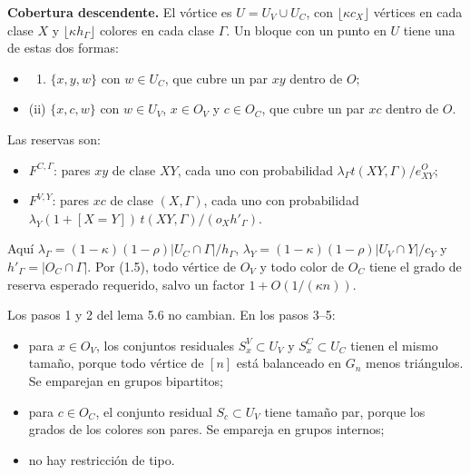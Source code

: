 \documentclass[spanish,11pt,a4paper]{article}
\providecommand{\tightlist}{\setlength{\itemsep}{0pt}\setlength{\parskip}{0pt}}
\begin{document}
\textbf{Cobertura descendente.} El vórtice es \(U=U_V\cup U_C\), con \(\lfloor\kappa c_X\rfloor\) vértices en cada clase \(X\) y \(\lfloor\kappa h_\Gamma\rfloor\) colores en cada clase \(\Gamma\). Un bloque con un punto en \(U\) tiene una de estas dos formas:

\begin{itemize}
\tightlist
\item
  \begin{enumerate}
  \def\labelenumi{(\romannumeral\value{enumi})}
  \tightlist
  \item
    \(\{x,y,w\}\) con \(w\in U_C\), que cubre un par \(xy\) dentro de \(O\);
  \end{enumerate}
\item
  (ii) \(\{x,c,w\}\) con \(w\in U_V\), \(x\in O_V\) y \(c\in O_C\), que cubre un par \(xc\) dentro de \(O\).
\end{itemize}

Las reservas son:

\begin{itemize}
\tightlist
\item
  \(F^{C,\Gamma}\): pares \(xy\) de clase \(XY\), cada uno con probabilidad \(\lambda_\Gamma t(XY,\Gamma)/e^O_{XY}\);
\item
  \(F^{V,Y}\): pares \(xc\) de clase \((X,\Gamma)\), cada uno con probabilidad \(\lambda_Y(1+[X=Y])\,t(XY,\Gamma)/(o_Xh'_\Gamma)\).
\end{itemize}

Aquí \(\lambda_\Gamma=(1-\kappa)(1-\rho)|U_C\cap\Gamma|/h_\Gamma\), \(\lambda_Y=(1-\kappa)(1-\rho)|U_V\cap Y|/c_Y\) y \(h'_\Gamma=|O_C\cap\Gamma|\). Por (1.5), todo vértice de \(O_V\) y todo color de \(O_C\) tiene el grado de reserva esperado requerido, salvo un factor \(1+O(1/(\kappa n))\).

Los pasos 1 y 2 del lema 5.6 no cambian. En los pasos 3--5:

\begin{itemize}
\tightlist
\item
  para \(x\in O_V\), los conjuntos residuales \(S^V_x\subset U_V\) y \(S^C_x\subset U_C\) tienen el mismo tamaño, porque todo vértice de \([n]\) está balanceado en \(G_n\) menos triángulos. Se emparejan en grupos bipartitos;
\item
  para \(c\in O_C\), el conjunto residual \(S_c\subset U_V\) tiene tamaño par, porque los grados de los colores son pares. Se empareja en grupos internos;
\item
  no hay restricción de tipo.
\end{itemize}
\end{document}

